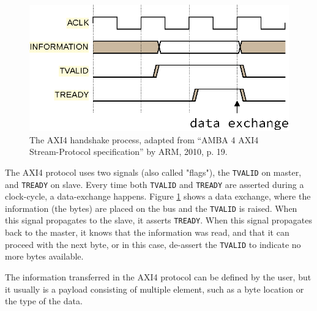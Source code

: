 \begin{figure}[h]
\centering
\includegraphics[scale=0.8]{implementation/axi4_handshake.eps}
\caption{The AXI4 handshake process, adapted from “AMBA 4 AXI4 Stream-Protocol
specification” by ARM, 2010, p. 19.}
\label{fig:axi4_handshake}
\end{figure}

The AXI4 protocol uses two signals (also called "flags"), the \texttt{TVALID}
on master, and \texttt{TREADY} on slave. Every time both \texttt{TVALID} and
\texttt{TREADY} are asserted during a clock-cycle, a data-exchange happens.
Figure \ref{fig:axi4_handshake} shows a data exchange, where the information
(the bytes) are placed on the bus and the \texttt{TVALID} is raised. When this
signal propagates to the slave, it asserts \texttt{TREADY}. When this signal
propagates back to the master, it knows that the information was read, and that
it can proceed with the next byte, or in this case, de-assert the
\texttt{TVALID} to indicate no more bytes available\cite{arm_axi4}.

The information transferred in the AXI4 protocol can be defined by the user,
but it usually is a payload consisting of multiple element, such as a byte
location or the type of the data.\\

